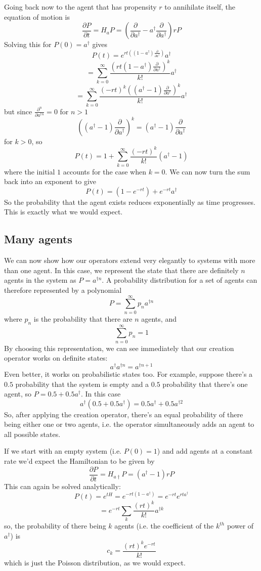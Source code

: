 \documentclass[letterpaper,twocolumn,10pt]{article}
\begin{document}
Going back now to the agent that has propensity $r$ to annihilate itself, the equation of motion is
\[
\frac{\partial P}{\partial t} = H_aP = \left(\frac{\partial }{\partial a^\dag} - a^\dag\frac{\partial }{\partial a^\dag}\right)rP
\]
Solving this for $P(0) = a^\dag$ gives
\[
P(t) = e^{rt((1-a^\dag)\frac{\partial}{\partial a^\dag})}a^\dag
\]
\[
 = \sum_{k=0}^\infty \frac{\left(rt(1-a^\dag)\frac{\partial}{\partial a^\dag}\right)^k}{k!}a^\dag
\]
\[
= \sum_{k=0}^\infty \frac{(-rt)^k\left((a^\dag-1)\frac{\partial}{\partial a^\dag}\right)^k}{k!}a^\dag
\]
but since $\frac{\partial^n}{\partial a^{\dag n}} = 0$ for $n>1$
\[
\left((a^\dag-1)\frac{\partial}{\partial a^\dag}\right)^k = (a^\dag-1)\frac{\partial}{\partial a^\dag}
\]
for $k>0$, so
\[
P(t) = 1 + \sum_{k=0}^\infty \frac{(-rt)^k}{k!}(a^\dag-1)
\]
where the initial $1$ accounts for the case when $k=0$. We can now turn the sum back into an exponent to give
\[
P(t) = (1 - e^{-rt}) + e^{-rt}a^\dag
\]
So the probability that the agent exists reduces exponentially as time progresses. This is exactly what we would expect.

\subsection{Many agents}

We can now show how our operators extend very elegantly to systems with more than one agent. In this case, we represent the state that there are definitely $n$ agents in the system as $P = a^{\dag n}$. A probability distribution for a set of agents can therefore represented by a polynomial
\[
P = \sum_{n=0}^\infty p_n a^{\dag n}
\]
where $p_n$ is the probability that there are $n$ agents, and
\[
\sum_{n=0}^\infty p_n = 1
\]
By choosing this representation, we can see immediately that our creation operator works on definite states:
\[
a^\dag a^{\dag n} = a^{\dag n+1}
\]
Even better, it works on probabilistic states too. For example, suppose there's a $0.5$ probability that the system is empty and a $0.5$ probability that there's one agent, so $P = 0.5 + 0.5a^\dag$. In this case
\[
a^\dag (0.5 + 0.5a^\dag) = 0.5a^\dag + 0.5a^{\dag 2}
\]
So, after applying the creation operator, there's an equal probability of there being either one or two agents, i.e. the operator simultaneously adds an agent to all possible states.

If we start with an empty system (i.e. $P(0) = 1$) and add agents at a constant rate we'd expect the Hamiltonian to be given by
\[
\frac{\partial P}{\partial t} = H_{a\dag}P = (a^\dag - 1)rP
\]
This can again be solved analytically:
\[
P(t) = e^{tH} = e^{-rt(1-a^\dag)} = e^{-rt}e^{rta^\dag}
\]
\[
= e^{-rt}\sum_k \frac{(rt)^k}{k!}a^{\dag k}
\]
so, the probability of there being $k$ agents (i.e. the coefficient of the $k^{th}$ power of $a^\dag$) is 
\[
c_k = \frac{(rt)^ke^{-rt}}{k!}
\]
which is just the Poisson distribution, as we would expect.
\end{document}
